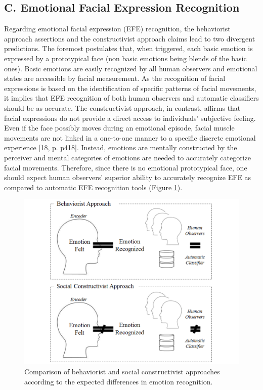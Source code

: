 \documentclass[conference,final,]{IEEEtran}
\makeatletter
\def\maxwidth{\ifdim\Gin@nat@width>\linewidth\linewidth
\else\Gin@nat@width\fi}
\let\Oldincludegraphics\includegraphics
\renewcommand{\includegraphics}[1]{\Oldincludegraphics[width=\maxwidth]{#1}}
\makeatother
\begin{document}
\hypertarget{c.-emotional-facial-expression-recognition}{%
\subsection{C. Emotional Facial Expression
Recognition}\label{c.-emotional-facial-expression-recognition}}

Regarding emotional facial expression (EFE) recognition, the behaviorist
approach assertions and the constructivist approach claims lead to two
divergent predictions. The foremost postulates that, when triggered,
each basic emotion is expressed by a prototypical face (non basic
emotions being blends of the basic ones). Basic emotions are easily
recognized by all human observers and emotional states are accessible by
facial measurement. As the recognition of facial expressions is based on
the identification of specific patterns of facial movements, it implies
that EFE recognition of both human observers and automatic classifiers
should be as accurate. The constructivist approach, in contrast, affirms
that facial expressions do not provide a direct access to individuals'
subjective feeling. Even if the face possibly moves during an emotional
episode, facial muscle movements are not linked in a one-to-one manner
to a specific discrete emotional experience {[}18, p. p418{]}. Instead,
emotions are mentally constructed by the perceiver and mental categories
of emotions are needed to accurately categorize facial movements.
Therefore, since there is no emotional prototypical face, one should
expect human observers' superior ability to accurately recognize EFE as
compared to automatic EFE recognition tools (Figure
\ref{fig:models_img}).

\begin{figure}
\centering
\includegraphics{ACII_2019_paper_files/figure-latex/models_img-1.pdf}
\caption{\label{fig:models_img}Comparison of behaviorist and social
constructivist approaches according to the expected differences in
emotion recognition.}
\end{figure}
\end{document}

